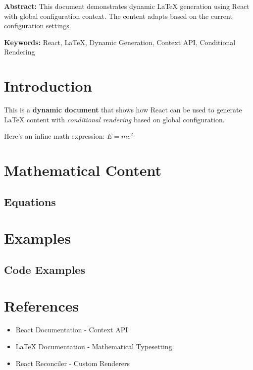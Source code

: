 \documentclass{article}
\begin{document}
\textbf{Abstract:} This document demonstrates dynamic LaTeX generation using React with global configuration context. The content adapts based on the current configuration settings.

\textbf{Keywords:} React, LaTeX, Dynamic Generation, Context API, Conditional Rendering

\section{Introduction}
This is a \textbf{dynamic document} that shows how React can be used to generate LaTeX content with \textit{conditional rendering} based on global configuration.

Here's an inline math expression: $E = mc^2$



\section{Mathematical Content}
\subsection{Equations}



\section{Examples}
\subsection{Code Examples}



\section{References}
\begin{itemize}
\item React Documentation - Context API
\item LaTeX Documentation - Mathematical Typesetting
\item React Reconciler - Custom Renderers
\end{itemize}
\end{document}
